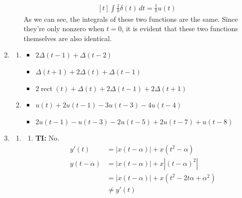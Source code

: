 \documentclass[12pt]{article}
\newcommand{\rect}{\operatorname{rect}}
\begin{document}
\begin{enumerate}
\begin{enumerate}
\[\begin{gathered}[t]
                                    \int \frac{1}{b}\delta(t)\,dt = \frac{1}{b}u(t)
                              \end{gathered}\]
                        As we can see, the integrals of these two functions are the same.
                        Since they're only nonzero when $t=0$, it is evident that
                        these two functions themselves are also identical. $\quad$
            \end{enumerate}
      \item \begin{enumerate}
                  \item \begin{itemize}
                              \item $2\Delta(t-1)+\Delta(t-2)$
                              \item $\Delta(t+1)+2\Delta(t)+\Delta(t-1)$
                              \item $2\rect(t)+\Delta(t)+2\Delta(t-1)+2\Delta(t+1)$
                        \end{itemize}
                  \item \begin{itemize}
                              \item $u(t)+2u(t-1)-3u(t-3)-4u(t-4)$
                              \item $2u(t-1)-u(t-3)-2u(t-5)+2u(t-7)+u(t-8)$
                        \end{itemize}
            \end{enumerate}
      \item \begin{enumerate}
                  \item \begin{enumerate}
                              \item \textbf{TI:} No.
                                    \begin{align*}
                                          y'(t)       & =|x(t-\alpha)|+x\left(t^2-\alpha\right)            \\
                                          y(t-\alpha) & =|x(t-\alpha)|+x\left|(t-\alpha)^2\right|          \\
                                                      & =|x(t-\alpha)|+x\left(t^2-2t\alpha+\alpha^2\right) \\
                                                      & \ne y'(t)
                                    \end{align*}


\end{enumerate}
\end{enumerate}
\end{enumerate}
\end{document}
